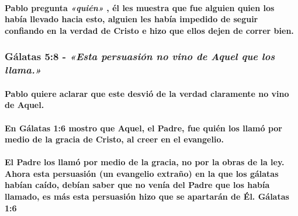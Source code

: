 \documentclass[11a pt,twoside]{article}
\newcommand{\scripture}[1]{%
  {\fontsize{12pt}{16pt}\selectfont\ScriptureFont\itshape #1}%
}
\let\oldsubsubsection\subsubsection
\renewcommand{\subsubsection}{\needspace{4\baselineskip}\oldsubsubsection}
\let\oldparagraph\paragraph
\renewcommand{\paragraph}{\needspace{3\baselineskip}\oldparagraph}
\begin{document}
\paragraph{\texorpdfstring{Pablo pregunta \scripture{«quién»}, él les
muestra que fue alguien quien los había llevado hacia esto, alguien les
había impedido de seguir confiando en la verdad de Cristo e hizo que
ellos dejen de correr
bien.}{Pablo pregunta , él les muestra que fue alguien quien los había llevado hacia esto, alguien les había impedido de seguir confiando en la verdad de Cristo e hizo que ellos dejen de correr bien.}}\label{pablo-pregunta-quiuxe9n-uxe9l-les-muestra-que-fue-alguien-quien-los-habuxeda-llevado-hacia-esto-alguien-les-habuxeda-impedido-de-seguir-confiando-en-la-verdad-de-cristo-e-hizo-que-ellos-dejen-de-correr-bien.}

\subsubsection{\texorpdfstring{Gálatas 5:8 -
\scripture{«Esta persuasión no vino de Aquel que los llama.»}}{Gálatas 5:8 - }}\label{guxe1latas-58---esta-persuasiuxf3n-no-vino-de-aquel-que-los-llama.}

\paragraph{Pablo quiere aclarar que este desvió de la verdad claramente
no vino de
Aquel.}\label{pablo-quiere-aclarar-que-este-desviuxf3-de-la-verdad-claramente-no-vino-de-aquel.}

\paragraph{En Gálatas 1:6 mostro que Aquel, el Padre, fue quién los
llamó por medio de la gracia de Cristo, al creer en el
evangelio.}\label{en-guxe1latas-16-mostro-que-aquel-el-padre-fue-quiuxe9n-los-llamuxf3-por-medio-de-la-gracia-de-cristo-al-creer-en-el-evangelio.}

\paragraph{El Padre los llamó por medio de la gracia, no por la obras de
la ley. Ahora esta persuasión (un evangelio extraño) en la que los
gálatas habían caído, debían saber que no venía del Padre que los había
llamado, es más esta persuasión hizo que se apartarán de Él. Gálatas
1:6}\label{el-padre-los-llamuxf3-por-medio-de-la-gracia-no-por-la-obras-de-la-ley.-ahora-esta-persuasiuxf3n-un-evangelio-extrauxf1o-en-la-que-los-guxe1latas-habuxedan-cauxeddo-debuxedan-saber-que-no-venuxeda-del-padre-que-los-habuxeda-llamado-es-muxe1s-esta-persuasiuxf3n-hizo-que-se-apartaruxe1n-de-uxe9l.-guxe1latas-16}
\end{document}
